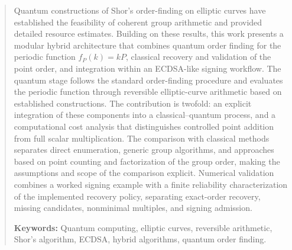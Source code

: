 \begin{abstract}

\begin{revision}
Quantum constructions of Shor's order-finding on elliptic curves have established the feasibility of coherent group arithmetic and provided detailed resource estimates. Building on these results, this work presents a modular hybrid architecture that combines quantum order finding for the periodic function $f_P(k)=kP$, classical recovery and validation of the point order, and integration within an ECDSA-like signing workflow. The quantum stage follows the standard order-finding procedure and evaluates the periodic function through reversible elliptic-curve arithmetic based on established constructions. The contribution is twofold: an explicit integration of these components into a classical--quantum process, and a computational cost analysis that distinguishes controlled point addition from full scalar multiplication. The comparison with classical methods separates direct enumeration, generic group algorithms, and approaches based on point counting and factorization of the group order, making the assumptions and scope of the comparison explicit. Numerical validation combines a worked signing example with a finite reliability characterization of the implemented recovery policy, separating exact-order recovery, missing candidates, nonminimal multiples, and signing admission.

\end{revision}

\textbf{Keywords:} Quantum computing, elliptic curves, reversible arithmetic, Shor's algorithm, ECDSA, hybrid algorithms, quantum order finding.

\end{abstract}